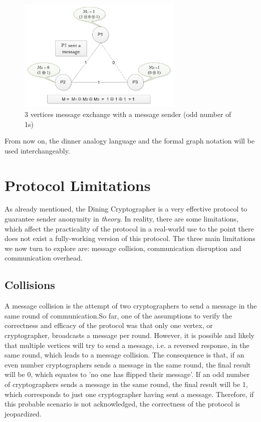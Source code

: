 \begin{figure}[h!]
    \centering
    \includegraphics[width=0.70\textwidth]{Images/DCFormalWithMessage.png}
    \caption{3 vertices message exchange with a message sender (odd number of 1s)}
    \label{fig:dcFormalWithMessage}
\end{figure}

From now on, the dinner analogy language and the formal graph notation will be used interchangeably. \newline \newline \newline

\section{Protocol Limitations} \label{sec:limitations}
As already mentioned, the Dining Cryptographer is a very effective protocol to guarantee sender anonymity in \textit{theory}. In reality, there are some limitations, which affect the practicality of the protocol in a real-world use to the point there does not exist a fully-working version of this protocol.
The three main limitations we now turn to explore are: message collision, communication disruption and communication overhead. 

\subsection{Collisions}
A message collision is the attempt of two cryptographers to send a message in the same round of communication.So far, one of the assumptions to verify the correctness and efficacy of the protocol was that only one vertex, or cryptographer, broadcasts a message per round. However, it is possible and likely that multiple vertices will try to send a message, i.e. a reversed response, in the same round, which leads to a message collision. The consequence is that, if an even number cryptographers sends a message in the same round, the final result will be 0, which equates to 'no one has flipped their message'. If an odd number of cryptographers sends a message in the same round, the final result will be 1, which corresponds to just one cryptographer having sent a message.
Therefore, if this probable scenario is not acknowledged, the correctness of the protocol is jeopardized.

